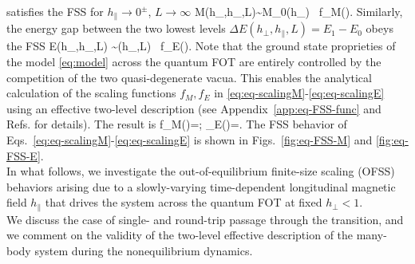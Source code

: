 \ee
satisfies the FSS for $h_\parallel \to0^\pm$, $L\to \infty$ \cite{campostrini2015finite, Nienhuis75}
\be\label{eq:eq-scalingM}
M(h_\perp,h_\parallel,L)\sim M_0(h_\perp) \ {f}_M(\kappa).
\ee
Similarly, the energy gap between the two lowest levels $\Delta E(h_\perp,h_\parallel,L)=E_1-E_0$ obeys the FSS
\be\label{eq:eq-scalingE}
\Delta E(h_\perp,h_\parallel,L) \sim \Delta(h_\perp,L) \ {f}_E(\kappa).
\ee
Note that the ground state proprieties of the model \eqref{eq:model} across the quantum FOT are entirely controlled by the competition of the two quasi-degenerate vacua. This enables the analytical calculation of the scaling functions ${ f}_M,{ f}_E$ in \eqref{eq:eq-scalingM}-\eqref{eq:eq-scalingE} using an effective two-level description (see Appendix~\ref{app:eq-FSS-func} and Refs.\cite{campostrini2014finite, PrivmanFisher85, Fisher82, FisherPrivman85} for details). The result is 
\be\label{eq:eq-scaling-func}
{ f}_M(\kappa)=; _E(\kappa)=.
\ee
The FSS behavior of Eqs.~\eqref{eq:eq-scalingM}-\eqref{eq:eq-scalingE} is shown in Figs.~\ref{fig:eq-FSS-M} and \ref{fig:eq-FSS-E}.\\

In what follows, we investigate the out-of-equilibrium finite-size scaling (OFSS) behaviors arising due to a slowly-varying time-dependent longitudinal magnetic field $h_\parallel$ that drives the system across the quantum FOT at fixed $h_\perp<1$. \\
We discuss the case of single- and round-trip passage through the transition, and we comment on the validity of the two-level effective description of the many-body system during the nonequilibrium dynamics. 

